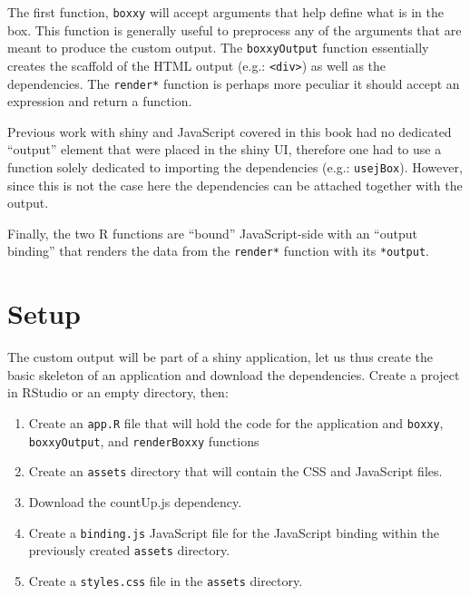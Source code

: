 \documentclass[
]{krantz}
\providecommand{\tightlist}{%
  \setlength{\itemsep}{0pt}\setlength{\parskip}{0pt}}
\begin{document}
The first function, \texttt{boxxy} will accept arguments that help define what is in the box. This function is generally useful to preprocess any of the arguments that are meant to produce the custom output. The \texttt{boxxyOutput} function essentially creates the scaffold of the HTML output (e.g.: \texttt{\textless{}div\textgreater{}}) as well as the dependencies. The \texttt{render*} function is perhaps more peculiar it should accept an expression and return a function.

Previous work with shiny and JavaScript covered in this book had no dedicated ``output'' element that were placed in the shiny UI, therefore one had to use a function solely dedicated to importing the dependencies (e.g.: \texttt{usejBox}). However, since this is not the case here the dependencies can be attached together with the output.

Finally, the two R functions are ``bound'' JavaScript-side with an ``output binding'' that renders the data from the \texttt{render*} function with its \texttt{*output}.

\hypertarget{setup}{%
\section{Setup}\label{setup}}

The custom output will be part of a shiny application, let us thus create the basic skeleton of an application and download the dependencies. Create a project in RStudio or an empty directory, then:

\begin{enumerate}
\def\labelenumi{\arabic{enumi}.}
\tightlist
\item
  Create an \texttt{app.R} file that will hold the code for the application and \texttt{boxxy}, \texttt{boxxyOutput}, and \texttt{renderBoxxy} functions
\item
  Create an \texttt{assets} directory that will contain the CSS and JavaScript files.
\item
  Download the countUp.js dependency.
\item
  Create a \texttt{binding.js} JavaScript file for the JavaScript binding within the previously created \texttt{assets} directory.
\item
  Create a \texttt{styles.css} file in the \texttt{assets} directory.
\end{enumerate}
\end{document}
